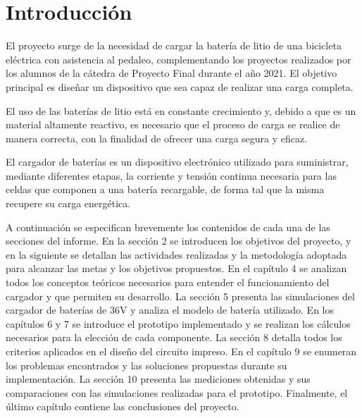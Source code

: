\section{Introducción}

El proyecto surge de la necesidad de cargar la batería de litio de una bicicleta eléctrica con asistencia al pedaleo,
complementando los proyectos realizados por los alumnos de la cátedra de Proyecto Final durante el año 2021.
El objetivo principal es diseñar un dispositivo que sea capaz de realizar una carga completa. 

El uso de las baterías de litio está en constante crecimiento y,
debido a que es un material altamente reactivo,
es necesario que el proceso de carga se realice de manera correcta,
con la finalidad de ofrecer una carga segura y eficaz.

El cargador de baterías es un dispositivo electrónico utilizado para suministrar, mediante diferentes etapas, la corriente y tensión continua necesaria para las celdas que componen a una batería recargable, de forma tal que la misma recupere su carga energética.

A continuación se especifican brevemente los contenidos de cada una de las secciones del informe. 
En la sección 2 se introducen los objetivos del proyecto, y en la siguiente se detallan las actividades realizadas y la metodología adoptada para alcanzar las metas y los objetivos propuestos.
En el capítulo 4 se analizan todos los conceptos teóricos necesarios para entender el funcionamiento del cargador y que permiten su desarrollo.
La sección 5 presenta las simulaciones del cargador de baterías de 36V y analiza el modelo de batería utilizado. 
En los capítulos 6 y 7 se introduce el prototipo implementado y se realizan los cálculos necesarios para la elección de cada componente.
La sección 8 detalla todos los criterios aplicados en el diseño del circuito impreso. 
En el capítulo 9 se enumeran los problemas encontrados y las soluciones propuestas durante su implementación. 
La sección 10 presenta las mediciones obtenidas y sus comparaciones con las simulaciones realizadas para el prototipo. 
Finalmente, el último capítulo contiene las conclusiones del proyecto. 